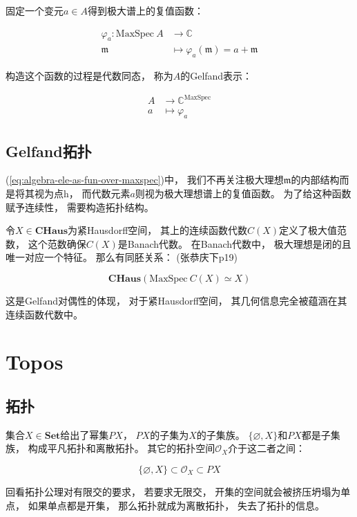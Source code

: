 \documentclass[10pt, openany]{book}
\begin{document}
固定一个变元$a \in A$得到极大谱上的复值函数：

\begin{equation}
\begin{aligned}
\varphi_a: \text{MaxSpec} \ A &\to \mathbb C \\
\mathfrak m &\mapsto \varphi_a(\mathfrak m) = a + \mathfrak m 
\end{aligned}
\end{equation}
\label{eq:algebra-ele-as-fun-over-maxspec}

构造这个函数的过程是代数同态，
称为$A$的Gelfand表示：

$$
\begin{aligned}
A &\to \mathbb C^{\text{MaxSpec}} \\
a &\mapsto \varphi_a 
\end{aligned}
$$

\section{Gelfand拓扑}

(\ref{eq:algebra-ele-as-fun-over-maxspec})中，
我们不再关注极大理想$\mathfrak m$的内部结构而是将其视为点h，
而代数元素$a$则视为极大理想谱上的复值函数。
为了给这种函数赋予连续性，
需要构造拓扑结构。

令$X\in\textbf{CHaus}$为紧Hausdorff空间，
其上的连续函数代数$C(X)$定义了极大值范数，
这个范数确保$C(X)$是Banach代数。
在Banach代数中，
极大理想是闭的且唯一对应一个特征。
那么有同胚关系：
(张恭庆下p19)

$$
\textbf{CHaus}(\text{MaxSpec} \ C(X) \simeq X)
$$

这是Gelfand对偶性的体现，
对于紧Hausdorff空间，
其几何信息完全被蕴涵在其连续函数代数中。


\chapter{Topos}

\section{拓扑}

集合$X \in \textbf{Set}$给出了幂集$PX$，
$PX$的子集为$X$的子集族。
$\{\varnothing,X\}$和$PX$都是子集族，
构成平凡拓扑和离散拓扑。
其它的拓扑空间$\mathcal O_X$介于这二者之间：

$$
\{\varnothing,X\} \subset \mathcal O_X \subset PX
$$

回看拓扑公理对有限交的要求，
若要求无限交，
开集的空间就会被挤压坍塌为单点，
如果单点都是开集，
那么拓扑就成为离散拓扑，
失去了拓扑的信息。
\end{document}

